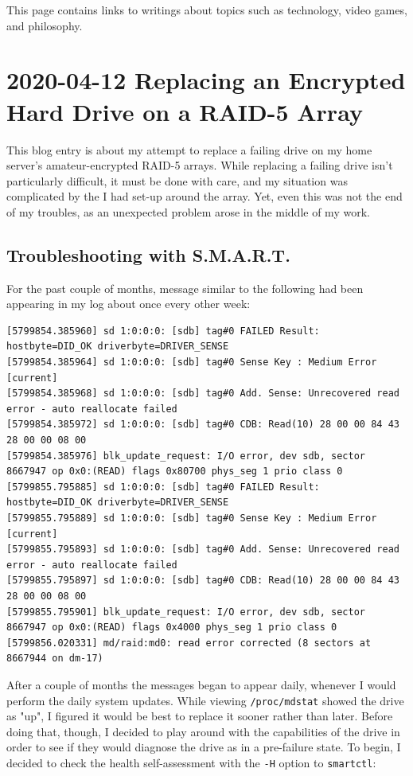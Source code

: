 \documentclass{article}
\begin{document}
This page contains links to writings about topics such as technology, video games, and philosophy.

\tableofchildlinks*

\section{2020-04-12 Replacing an Encrypted Hard Drive on a RAID-5 Array}
This blog entry is about my attempt to replace a failing drive on my home server's amateur-encrypted RAID-5 arrays.  While replacing a failing drive isn't particularly difficult, it must be done with care, and my situation was complicated by the  I had set-up around the array.  Yet, even this was not the end of my troubles, as an unexpected problem arose in the middle of my work.

\subsection{Troubleshooting with S.M.A.R.T.}
For the past couple of months, message similar to the following had been appearing in my log about once every other week:

\begin{verbatim}
[5799854.385960] sd 1:0:0:0: [sdb] tag#0 FAILED Result: hostbyte=DID_OK driverbyte=DRIVER_SENSE
[5799854.385964] sd 1:0:0:0: [sdb] tag#0 Sense Key : Medium Error [current]
[5799854.385968] sd 1:0:0:0: [sdb] tag#0 Add. Sense: Unrecovered read error - auto reallocate failed
[5799854.385972] sd 1:0:0:0: [sdb] tag#0 CDB: Read(10) 28 00 00 84 43 28 00 00 08 00
[5799854.385976] blk_update_request: I/O error, dev sdb, sector 8667947 op 0x0:(READ) flags 0x80700 phys_seg 1 prio class 0
[5799855.795885] sd 1:0:0:0: [sdb] tag#0 FAILED Result: hostbyte=DID_OK driverbyte=DRIVER_SENSE
[5799855.795889] sd 1:0:0:0: [sdb] tag#0 Sense Key : Medium Error [current]
[5799855.795893] sd 1:0:0:0: [sdb] tag#0 Add. Sense: Unrecovered read error - auto reallocate failed
[5799855.795897] sd 1:0:0:0: [sdb] tag#0 CDB: Read(10) 28 00 00 84 43 28 00 00 08 00
[5799855.795901] blk_update_request: I/O error, dev sdb, sector 8667947 op 0x0:(READ) flags 0x4000 phys_seg 1 prio class 0
[5799856.020331] md/raid:md0: read error corrected (8 sectors at 8667944 on dm-17)
\end{verbatim}

After a couple of months the messages began to appear daily, whenever I would perform the daily system updates.  While viewing \texttt{/proc/mdstat} showed the drive as "up", I figured it would be best to replace it sooner rather than later.  Before doing that, though, I decided to play around with the  capabilities of the drive in order to see if they would diagnose the drive as in a pre-failure state.   To begin, I decided to check the health self-assessment with the \texttt{-H} option to \texttt{smartctl}:
\end{document}
